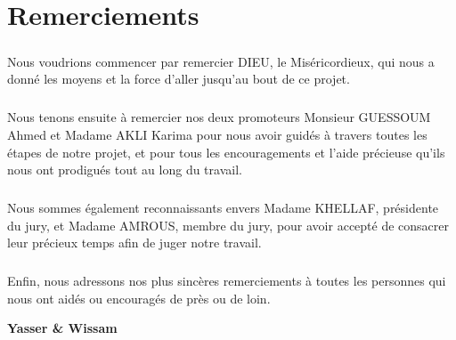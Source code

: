 \chapter*{Remerciements}    

\vspace{1.5cm}
\paragraph{}
Nous voudrions commencer par remercier DIEU, le Miséricordieux, qui nous a donné les moyens et la force d'aller jusqu'au bout de ce projet.
\paragraph{}
Nous tenons ensuite à remercier nos deux promoteurs Monsieur GUESSOUM Ahmed et Madame AKLI Karima pour nous avoir guidés à travers toutes les étapes de notre projet, et pour tous les encouragements et l'aide précieuse qu'ils nous ont prodigués tout au long du travail.
\paragraph{}
Nous sommes également reconnaissants envers Madame KHELLAF, présidente du jury, et Madame AMROUS, membre du jury, pour avoir accepté de consacrer leur précieux temps afin de juger notre travail.
\paragraph{}
Enfin, nous adressons nos plus sincères remerciements à toutes les personnes qui nous ont aidés ou encouragés de près ou de loin.
\vspace{0.5cm}
\begin{center}
	\Large
	\hspace{8.5cm}
	\textbf{Yasser \& Wissam}
\end{center}